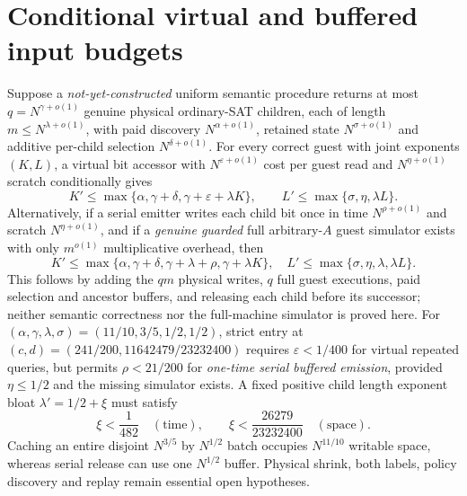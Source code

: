 \documentclass[10pt]{article}
\begin{document}
\section{Conditional virtual and buffered input budgets}
Suppose a \emph{not-yet-constructed} uniform semantic procedure returns at most $q=N^{\gamma+o(1)}$ genuine physical ordinary-SAT children, each of length $m\le N^{\lambda+o(1)}$, with paid discovery $N^{\alpha+o(1)}$, retained state $N^{\sigma+o(1)}$ and additive per-child selection $N^{\delta+o(1)}$. For every correct guest with joint exponents $(K,L)$, a virtual bit accessor with $N^{\varepsilon+o(1)}$ cost per guest read and $N^{\eta+o(1)}$ scratch conditionally gives
\[
K'\le\max\{\alpha,\gamma+\delta,\gamma+\varepsilon+\lambda K\},\qquad
L'\le\max\{\sigma,\eta,\lambda L\}.
\]
Alternatively, if a serial emitter writes each child bit once in time $N^{\rho+o(1)}$ and scratch $N^{\eta+o(1)}$, and if a \emph{genuine guarded} full arbitrary-$A$ guest simulator exists with only $m^{o(1)}$ multiplicative overhead, then
\[
K'\le\max\{\alpha,\gamma+\delta,\gamma+\lambda+\rho,\gamma+\lambda K\},\quad
L'\le\max\{\sigma,\eta,\lambda,\lambda L\}.
\]
This follows by adding the $q m$ physical writes, $q$ full guest executions, paid selection and ancestor buffers, and releasing each child before its successor; neither semantic correctness nor the full-machine simulator is proved here. For $(\alpha,\gamma,\lambda,\sigma)=(11/10,3/5,1/2,1/2)$, strict entry at $(c,d)=(241/200,11642479/23232400)$ requires $\varepsilon<1/400$ for virtual repeated queries, but permits $\rho<21/200$ for \emph{one-time serial buffered emission}, provided $\eta\le1/2$ and the missing simulator exists. A fixed positive child length exponent bloat $\lambda'=1/2+\xi$ must satisfy
\[
\xi<\frac1{482}\quad(\mathrm{time}),\qquad
\xi<\frac{26279}{23232400}\quad(\mathrm{space}).
\]
Caching an entire disjoint $N^{3/5}$ by $N^{1/2}$ batch occupies $N^{11/10}$ writable space, whereas serial release can use one $N^{1/2}$ buffer. Physical shrink, both labels, policy discovery and replay remain essential open hypotheses.
\end{document}

